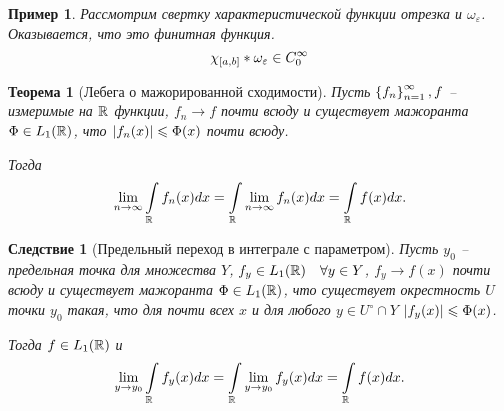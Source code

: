 \documentclass[a5paper, 10pt]{article}
\theoremstyle{definition}
\theoremstyle{plain}
\newtheorem{Th}{Теорема}
\newtheorem{Cor}{Следствие}
\newtheorem{Ex}{Пример}
\theoremstyle{remark}
\begin{document}
    \begin{Ex}
        Рассмотрим свертку характеристической функции отрезка и $\omega_\varepsilon$. Оказывается, что это финитная функция.
        \[
            \chi_{\left[a,b\right]} * \omega_\varepsilon \in C_0^{\infty}
        \] 

    \end{Ex}

    \begin{Th}[Лебега о мажорированной сходимости]
        Пусть $\left\{f_n\right\}_{n=1}^\infty, f$ -- измеримые на  $\mathbb{R}$ функции, $f_n\to f$ почти всюду и существует мажоранта $\Phi\in L_1(\mathbb{R} )$, что $\left|f_n(x)\right| \leqslant \Phi(x)$ почти всюду.

        Тогда \[
            \lim\limits_{n\rightarrow\infty} \int\limits_{\mathbb{R}} f_n(x) dx = \int\limits_{\mathbb{R}} \lim\limits_{n\rightarrow\infty} f_n(x) dx = \int\limits_{\mathbb{R}} f(x) dx.
        \] 
    \end{Th}

    \begin{Cor}[Предельный переход в интеграле с параметром]
        Пусть $y_0$ -- предельная точка для множества $Y$, $f_y \in L_1(\mathbb{R}) \quad \forall y\in Y$, $f_y \to f(x)$ почти всюду и существует мажоранта $\Phi\in L_1(\mathbb{R})$, что существует окрестность  $U$ точки $y_0$ такая, что для почти всех $x$ и для любого $y\in U^{\circ} \cap Y$ $\left|f_y(x)\right|\leqslant \Phi(x)$.

        Тогда $f\in L_1(\mathbb{R})$ и \[
            \lim\limits_{y\rightarrow y_0} \int\limits_{\mathbb{R}} f_y(x) dx = \int\limits_{\mathbb{R}} \lim\limits_{y\rightarrow y_0} f_y(x) dx = \int\limits_{\mathbb{R}} f(x) dx.
        \] 
    \end{Cor}
\end{document}
